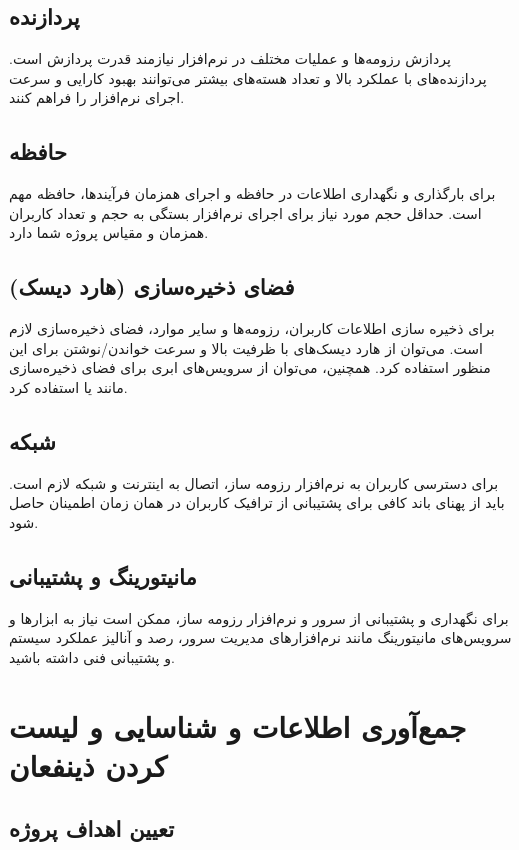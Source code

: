 \documentclass[]{article}
\begin{document}
	
	\subsection{\LARGE{پردازنده }}
	پردازش رزومه‌ها و عملیات مختلف در نرم‌افزار نیازمند قدرت پردازش است. پردازنده‌های با عملکرد بالا و تعداد هسته‌های بیشتر می‌توانند بهبود کارایی و سرعت اجرای نرم‌افزار را فراهم کنند.
	
	\subsection{\LARGE{حافظه }}
	برای بارگذاری و نگهداری اطلاعات در حافظه و اجرای همزمان فرآیندها، حافظه  مهم است. حداقل حجم مورد نیاز برای اجرای نرم‌افزار بستگی به حجم و تعداد کاربران همزمان و مقیاس پروژه شما دارد.
	
	\subsection{\LARGE{فضای ذخیره‌سازی (هارد دیسک)}}
	
	برای ذخیره سازی اطلاعات کاربران، رزومه‌ها و سایر موارد، فضای ذخیره‌سازی لازم است. می‌توان از هارد دیسک‌های با ظرفیت بالا و سرعت خواندن/نوشتن برای این منظور استفاده کرد. همچنین، می‌توان از سرویس‌های ابری برای فضای ذخیره‌سازی مانند  یا  استفاده کرد.
	
	\subsection{\LARGE{شبکه}}
	برای دسترسی کاربران به نرم‌افزار رزومه ساز، اتصال به اینترنت و شبکه لازم است. باید از پهنای باند کافی برای پشتیبانی از ترافیک کاربران در همان زمان اطمینان حاصل شود.
	
	\subsection{\LARGE{مانیتورینگ و پشتیبانی}}
	برای نگهداری و پشتیبانی از سرور و نرم‌افزار رزومه ساز، ممکن است نیاز به ابزارها و سرویس‌های مانیتورینگ مانند نرم‌افزارهای مدیریت سرور، رصد و آنالیز عملکرد سیستم و پشتیبانی فنی داشته باشید.
	
	\section{\huge{جمع‌آوری اطلاعات و شناسایی و لیست کردن ذینفعان}}
	
	
	\subsection{\LARGE{تعیین اهداف پروژه}}
	
\end{document}
